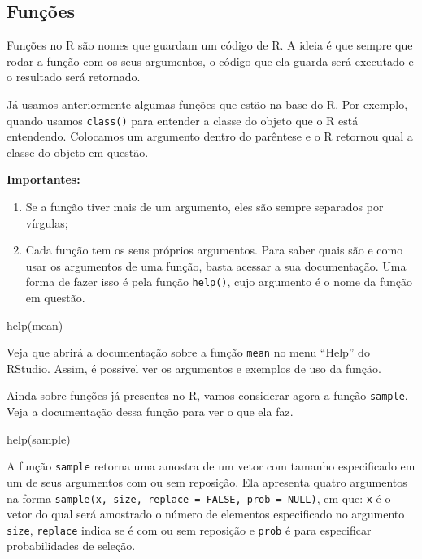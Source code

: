 \documentclass[
  letterpaper,
  DIV=11,
  numbers=noendperiod]{scrreprt}
\newenvironment{Shaded}{\begin{snugshade}}{\end{snugshade}}
\newcommand{\FunctionTok}[1]{\textcolor[rgb]{0.28,0.35,0.67}{#1}}
\newcommand{\NormalTok}[1]{\textcolor[rgb]{0.00,0.23,0.31}{#1}}
\begin{document}
\hypertarget{funuxe7uxf5es}{%
\subsection{Funções}\label{funuxe7uxf5es}}

Funções no R são nomes que guardam um código de R. A ideia é que sempre
que rodar a função com os seus argumentos, o código que ela guarda será
executado e o resultado será retornado.

Já usamos anteriormente algumas funções que estão na base do R. Por
exemplo, quando usamos \texttt{class()} para entender a classe do objeto
que o R está entendendo. Colocamos um argumento dentro do parêntese e o
R retornou qual a classe do objeto em questão.

\textbf{Importantes:}

\begin{enumerate}
\def\labelenumi{\arabic{enumi})}
\item
  Se a função tiver mais de um argumento, eles são sempre separados por
  vírgulas;
\item
  Cada função tem os seus próprios argumentos. Para saber quais são e
  como usar os argumentos de uma função, basta acessar a sua
  documentação. Uma forma de fazer isso é pela função \texttt{help()},
  cujo argumento é o nome da função em questão.
\end{enumerate}

\begin{Shaded}
\begin{Highlighting}[]
\FunctionTok{help}\NormalTok{(mean)}
\end{Highlighting}
\end{Shaded}

Veja que abrirá a documentação sobre a função \texttt{mean} no menu
``Help'' do RStudio. Assim, é possível ver os argumentos e exemplos de
uso da função.

Ainda sobre funções já presentes no R, vamos considerar agora a função
\texttt{sample}. Veja a documentação dessa função para ver o que ela
faz.

\begin{Shaded}
\begin{Highlighting}[]
\FunctionTok{help}\NormalTok{(sample)}
\end{Highlighting}
\end{Shaded}

A função \texttt{sample} retorna uma amostra de um vetor com tamanho
especificado em um de seus argumentos com ou sem reposição. Ela
apresenta quatro argumentos na forma
\texttt{sample(x,\ size,\ replace\ =\ FALSE,\ prob\ =\ NULL)}, em que:
\texttt{x} é o vetor do qual será amostrado o número de elementos
especificado no argumento \texttt{size}, \texttt{replace} indica se é
com ou sem reposição e \texttt{prob} é para especificar probabilidades
de seleção.
\end{document}
